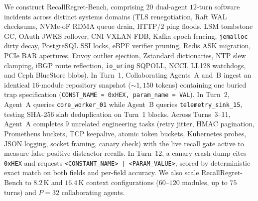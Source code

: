 \documentclass[final,5p,times,twocolumn]{elsarticle}
\theoremstyle{definition}
\theoremstyle{remark}
\newcommand{\RecallBench}{\textup{\textsc{RecallRegret-Bench}}}
\def\RecallBench{RecallRegret-Bench}%
\begin{document}
We construct \RecallBench{}, comprising $20$ dual-agent $12$-turn software incidents across distinct systems domains (TLS renegotiation, Raft WAL checksums, NVMe-oF RDMA queue drain, HTTP/2 ping floods, LSM tombstone GC, OAuth JWKS rollover, CNI VXLAN FDB, Kafka epoch fencing, \texttt{jemalloc} dirty decay, PostgreSQL SSI locks, eBPF verifier pruning, Redis ASK migration, PCIe BAR apertures, Envoy outlier ejection, Zstandard dictionaries, NTP slew clamping, iBGP route reflection, \texttt{io\_uring} SQPOLL, NCCL LL128 watchdogs, and Ceph BlueStore blobs). In Turn~1, Collaborating Agents~A and~B ingest an identical $16$-module repository snapshot ($\sim\!1{,}150$ tokens) containing one buried trap specification (\texttt{CONST\_NAME = 0xHEX, param\_name = VAL}). In Turn~2, Agent~A queries \texttt{core\_worker\_01} while Agent~B queries \texttt{telemetry\_sink\_15}, testing SHA-256 slab deduplication on Turn~1 blocks. Across Turns~3--11, Agent~A completes $9$ unrelated engineering tasks (retry jitter, HMAC pagination, Prometheus buckets, TCP keepalive, atomic token buckets, Kubernetes probes, JSON logging, socket framing, canary check) with the live recall gate active to measure false-positive distractor recalls. In Turn~12, a canary crash dump cites \texttt{0xHEX} and requests \texttt{<CONSTANT\_NAME> | <PARAM\_VALUE>}, scored by deterministic exact match on both fields and per-field accuracy. We also scale \RecallBench{} to $8.2$\,K and $16.4$\,K context configurations ($60$--$120$ modules, up to $75$ turns) and $P=32$ collaborating agents.
\end{document}
